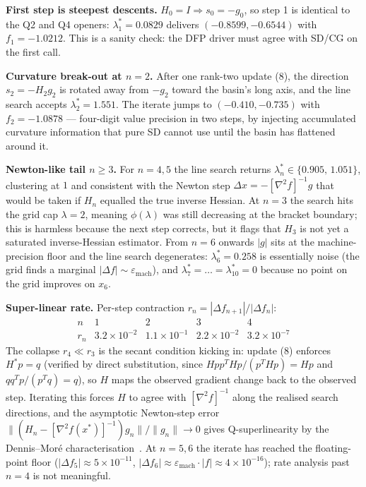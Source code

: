 \documentclass[11pt,a4paper]{article}
\begin{document}
\textbf{First step is steepest descents.}
\(H_0=I\Rightarrow s_0=-g_0\), so step 1 is identical to the Q2 and Q4 openers: \(\lambda_1^{\ast}=0.0829\) delivers \((-0.8599,-0.6544)\) with \(f_1=-1.0212\). This is a sanity check: the DFP driver must agree with SD/CG on the first call.

\textbf{Curvature break-out at \(n=2\).}
After one rank-two update (8), the direction \(s_2=-H_2 g_2\) is rotated away from \(-g_2\) toward the basin's long axis, and the line search accepts \(\lambda_2^{\ast}=1.551\). The iterate jumps to \((-0.410,-0.735)\) with \(f_2=-1.0878\) --- four-digit value precision in two steps, by injecting accumulated curvature information that pure SD cannot use until the basin has flattened around it.

\textbf{Newton-like tail \(n\ge 3\).}
For \(n=4,5\) the line search returns \(\lambda_n^{\ast}\in\{0.905,\,1.051\}\), clustering at \(1\) and consistent with the Newton step \(\Delta x=-[\nabla^{2}f]^{-1}g\) that would be taken if \(H_n\) equalled the true inverse Hessian. At \(n=3\) the search hits the grid cap \(\lambda=2\), meaning \(\phi(\lambda)\) was still decreasing at the bracket boundary; this is harmless because the next step corrects, but it flags that \(H_3\) is not yet a saturated inverse-Hessian estimator. From \(n=6\) onwards \(|g|\) sits at the machine-precision floor and the line search degenerates: \(\lambda_6^{\ast}=0.258\) is essentially noise (the grid finds a marginal \(|\Delta f|\sim\varepsilon_{\text{mach}}\)), and \(\lambda_7^{\ast}=\dots=\lambda_{10}^{\ast}=0\) because no point on the grid improves on \(x_6\).

\textbf{Super-linear rate.}
Per-step contraction \(r_n=|\Delta f_{n+1}|/|\Delta f_n|\):
\[
\begin{array}{c|cccc}
n & 1 & 2 & 3 & 4\\\hline
r_n & 3.2\times 10^{-2} & 1.1\times 10^{-1} & 2.2\times 10^{-2} & 3.2\times 10^{-7}
\end{array}
\]
The collapse \(r_4\ll r_3\) is the secant condition kicking in: update (8) enforces \(H^{\ast}p=q\) (verified by direct substitution, since \(H p p^{T} H p/(p^{T}Hp)=Hp\) and \(qq^{T}p/(p^{T}q)=q\)), so \(H\) maps the observed gradient change back to the observed step. Iterating this forces \(H\) to agree with \([\nabla^{2}f]^{-1}\) along the realised search directions, and the asymptotic Newton-step error \(\|(H_n-[\nabla^{2}f(x^{\ast})]^{-1})g_n\|/\|g_n\|\to 0\) gives Q-superlinearity by the Dennis--Mor\'e characterisation~\cite{dennis-more}. At \(n=5,6\) the iterate has reached the floating-point floor (\(|\Delta f_5|\approx 5\times 10^{-11}\), \(|\Delta f_6|\approx\varepsilon_{\text{mach}}\cdot|f|\approx 4\times 10^{-16}\)); rate analysis past \(n=4\) is not meaningful.
\end{document}
